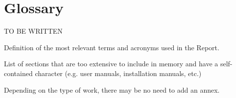 ﻿\documentclass[ENG]{TFUOC}%
\begin{document}


\chapter{Glossary}

TO BE WRITTEN

Definition of the most relevant terms and acronyms used in the Report.





\newpage
\appendix
List of sections that are too extensive to include in memory and have a self-contained character (e.g. user manuals, installation manuals, etc.)
 
Depending on the type of work, there may be no need to add an annex.
\end{document}
